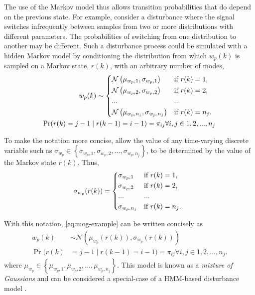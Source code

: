 The use of the Markov model thus allows transition probabilities that do depend on the previous state. For example, consider a disturbance where the signal switches infrequently between samples from two or more distributions with different parameters. The probabilities of switching from one distribution to another may be different. Such a disturbance process could be simulated with a hidden Markov model by conditioning the distribution from which $w_p(k)$ is sampled on a Markov state, $r(k)$, with an arbitrary number of modes,
%
\begin{equation} \label{eq:mog-example}
	\begin{split}
		w_p(k) \sim 
		\begin{cases*}
			\mathcal{N}\left(\mu_{w_p,1}, \sigma_{w_p,1}\right) & if $r(k)=1$, \\
			\mathcal{N}\left(\mu_{w_p,2}, \sigma_{w_p,2}\right) & if $r(k)=2$, \\
			... & ...\\
			\mathcal{N}\left(\mu_{w_p,n_j}, \sigma_{w_p,n_j}\right) & if $r(k)=n_j$.
		\end{cases*} \\
	\Pr(r(k)=j-1 \mid r(k-1)=i-1)=\pi_{ij} \forall i,j \in {1,2,...,n_j}
	\end{split}
\end{equation}

To make the notation more concise, allow the value of any time-varying discrete variable such as $\sigma_{w_p} \in \left\{\sigma_{w_p,1}, \sigma_{w_p,2},..., \sigma_{w_p,n_j}\right\}$, to be determined by the value of the Markov state $r(k)$. Thus,
\begin{equation} \label{eq:A-selection}
	\sigma_{w_p}(r(k)) = 
	\begin{cases*}
		\sigma_{w_p,1} & if $r(k)=1$, \\
		\sigma_{w_p,2} & if $r(k)=2$, \\
		... & ...\\
		\sigma_{w_p,n_j} & if $r(k)=n_j$.
	\end{cases*}
\end{equation}

With this notation, \eqref{eq:mog-example} can be written concisely as
\begin{equation} \label{eq:mog-example2}
	\begin{aligned}
		w_p(k) &\sim \mathcal{N}\left(\mu_{w_p}(r(k)), \sigma_{w_p}(r(k))\right) \\
		\Pr(r(k) &= j-1 \mid r(k-1)=i-1)=\pi_{ij} \forall i,j \in {1,2,...,n_j}.
	\end{aligned}
\end{equation}
where $\mu_{w_p}\in\left\{\mu_{w_p,1},\mu_{w_p,2},...,\mu_{w_p,n_j}\right\}$. This model is known as a \textit{mixture of Gaussians} and can be considered a special-case of a HMM-based disturbance model \citep{wong_disturbance_2007}.

